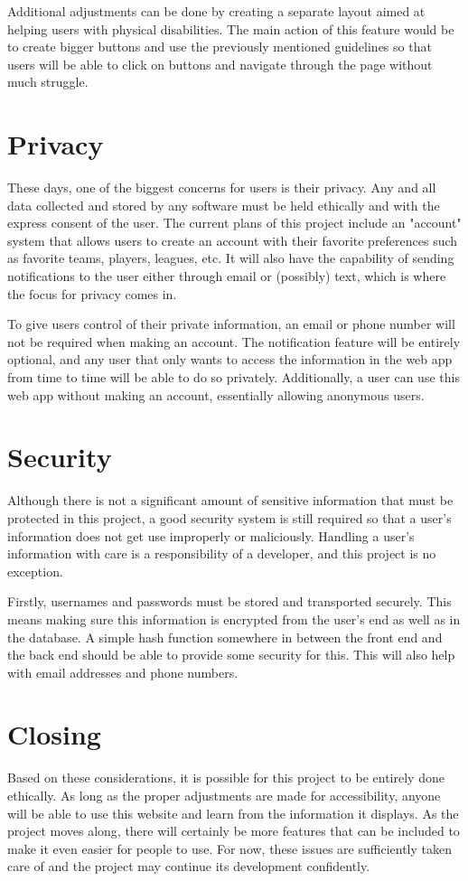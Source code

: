 \documentclass[10pt,twocolumn]{article}
\begin{document}
Additional adjustments can be done by creating a separate layout aimed at helping users with physical disabilities. The main action of this feature would be to create bigger buttons and use the previously mentioned guidelines so that users will be able to click on buttons and navigate through the page without much struggle. 

\section{Privacy}

These days, one of the biggest concerns for users is their privacy.
Any and all data collected and stored by any software must be held ethically and with the express consent of the user.
The current plans of this project include an "account" system that allows users to create an account with their favorite preferences such as favorite teams, players, leagues, etc.
It will also have the capability of sending notifications to the user either through email or (possibly) text, which is where the focus for privacy comes in.

To give users control of their private information, an email or phone number will not be required when making an account.
The notification feature will be entirely optional, and any user that only wants to access the information in the web app from time to time will be able to do so privately.
Additionally, a user can use this web app without making an account, essentially allowing anonymous users.

\section{Security}

Although there is not a significant amount of sensitive information that must be protected in this project, a good security system is still required so that a user's information does not get use improperly or maliciously.
Handling a user's information with care is a responsibility of a developer, and this project is no exception.

Firstly, usernames and passwords must be stored and transported securely.
This means making sure this information is encrypted from the user's end as well as in the database.
A simple hash function somewhere in between the front end and the back end should be able to provide some security for this.
This will also help with email addresses and phone numbers.

\section{Closing}

Based on these considerations, it is possible for this project to be entirely done ethically.
As long as the proper adjustments are made for accessibility, anyone will be able to use this website and learn from the information it displays.
As the project moves along, there will certainly be more features that can be included to make it even easier for people to use.
For now, these issues are sufficiently taken care of and the project may continue its development confidently.

\printbibliography
\end{document}
